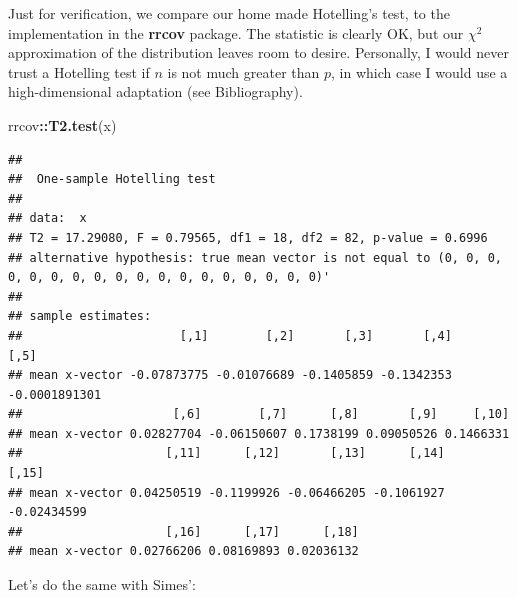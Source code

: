 \documentclass[]{book}
\newenvironment{Shaded}{\begin{snugshade}}{\end{snugshade}}
\newcommand{\CommentTok}[1]{\textcolor[rgb]{0.56,0.35,0.01}{\textit{#1}}}
\newcommand{\ControlFlowTok}[1]{\textcolor[rgb]{0.13,0.29,0.53}{\textbf{#1}}}
\newcommand{\DataTypeTok}[1]{\textcolor[rgb]{0.13,0.29,0.53}{#1}}
\newcommand{\DecValTok}[1]{\textcolor[rgb]{0.00,0.00,0.81}{#1}}
\newcommand{\KeywordTok}[1]{\textcolor[rgb]{0.13,0.29,0.53}{\textbf{#1}}}
\newcommand{\NormalTok}[1]{#1}
\newcommand{\OperatorTok}[1]{\textcolor[rgb]{0.81,0.36,0.00}{\textbf{#1}}}
\newcommand{\StringTok}[1]{\textcolor[rgb]{0.31,0.60,0.02}{#1}}
\theoremstyle{definition}
\theoremstyle{definition}
\theoremstyle{definition}
\theoremstyle{remark}
\begin{document}
Just for verification, we compare our home made Hotelling's test, to the implementation in the \textbf{rrcov} package.
The statistic is clearly OK, but our \(\chi^2\) approximation of the distribution leaves room to desire.
Personally, I would never trust a Hotelling test if \(n\) is not much greater than \(p\), in which case I would use a high-dimensional adaptation (see Bibliography).

\begin{Shaded}
\begin{Highlighting}[]
\NormalTok{rrcov}\OperatorTok{::}\KeywordTok{T2.test}\NormalTok{(x)}
\end{Highlighting}
\end{Shaded}

\begin{verbatim}
## 
##  One-sample Hotelling test
## 
## data:  x
## T2 = 17.29080, F = 0.79565, df1 = 18, df2 = 82, p-value = 0.6996
## alternative hypothesis: true mean vector is not equal to (0, 0, 0, 0, 0, 0, 0, 0, 0, 0, 0, 0, 0, 0, 0, 0, 0, 0)' 
## 
## sample estimates:
##                      [,1]        [,2]       [,3]       [,4]          [,5]
## mean x-vector -0.07873775 -0.01076689 -0.1405859 -0.1342353 -0.0001891301
##                     [,6]        [,7]      [,8]       [,9]     [,10]
## mean x-vector 0.02827704 -0.06150607 0.1738199 0.09050526 0.1466331
##                    [,11]      [,12]       [,13]      [,14]       [,15]
## mean x-vector 0.04250519 -0.1199926 -0.06466205 -0.1061927 -0.02434599
##                    [,16]      [,17]      [,18]
## mean x-vector 0.02766206 0.08169893 0.02036132
\end{verbatim}

Let's do the same with Simes':

\begin{Shaded}
\end{Shaded}
\end{document}
